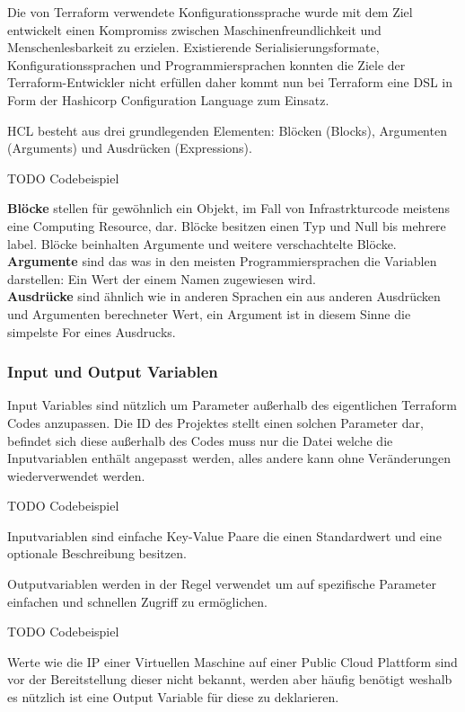 Die von Terraform verwendete Konfigurationssprache wurde mit dem Ziel
entwickelt einen Kompromiss zwischen Maschinenfreundlichkeit und
Menschenlesbarkeit zu erzielen. Existierende Serialisierungsformate,
Konfigurationssprachen und Programmiersprachen konnten die Ziele
der Terraform-Entwickler nicht erfüllen daher kommt nun bei Terraform
eine DSL in Form der Hashicorp Configuration Language zum Einsatz.

HCL besteht aus drei grundlegenden Elementen: Blöcken (Blocks), Argumenten
(Arguments) und Ausdrücken (Expressions).

TODO Codebeispiel

\textbf{Blöcke} stellen für gewöhnlich ein Objekt, im Fall von
Infrastrkturcode meistens eine Computing Resource, dar.
Blöcke besitzen einen Typ und Null bis mehrere label. Blöcke beinhalten
Argumente und weitere verschachtelte Blöcke.\\
\textbf{Argumente} sind das was in den meisten Programmiersprachen die
Variablen darstellen: Ein Wert der einem Namen zugewiesen wird.\\
\textbf{Ausdrücke} sind ähnlich wie in anderen Sprachen ein aus anderen
Ausdrücken und Argumenten berechneter Wert, ein Argument ist in diesem Sinne
die simpelste For eines Ausdrucks.

\subsubsection{Input und Output Variablen}

Input Variables sind nützlich um Parameter außerhalb des eigentlichen
Terraform Codes anzupassen. Die ID des Projektes stellt einen solchen
Parameter dar, befindet sich diese außerhalb des Codes muss nur die Datei
welche die Inputvariablen enthält angepasst werden, alles andere kann ohne
Veränderungen wiederverwendet werden.

TODO Codebeispiel

Inputvariablen sind einfache Key-Value Paare die einen Standardwert und
eine optionale Beschreibung besitzen.

Outputvariablen werden in der Regel verwendet um auf spezifische Parameter
einfachen und schnellen Zugriff zu ermöglichen.

TODO Codebeispiel

Werte wie die IP einer
Virtuellen Maschine auf einer Public Cloud Plattform sind vor der
Bereitstellung dieser nicht bekannt, werden aber häufig benötigt weshalb es
nützlich ist eine Output Variable für diese zu deklarieren.

